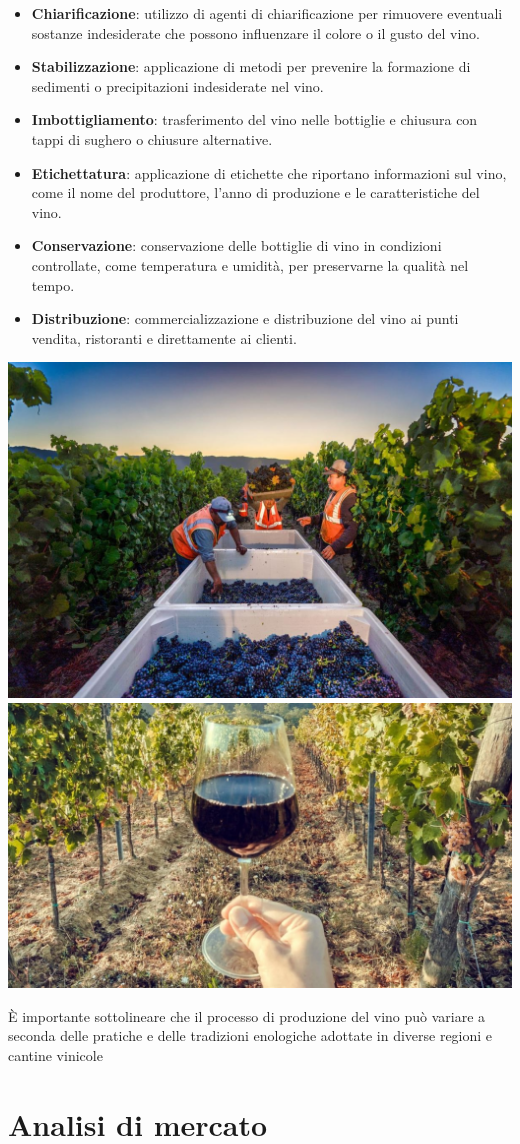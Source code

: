 \documentclass[12pt, a4paper]{article}
\begin{document}
\begin{itemize}
    \item \textbf{Chiarificazione}: utilizzo di agenti di chiarificazione per rimuovere eventuali sostanze indesiderate che possono influenzare il colore o il gusto del vino.
    \item \textbf{Stabilizzazione}: applicazione di metodi per prevenire la formazione di sedimenti o precipitazioni indesiderate nel vino.
    \item \textbf{Imbottigliamento}: trasferimento del vino nelle bottiglie e chiusura con tappi di sughero o chiusure alternative.
    \item \textbf{Etichettatura}: applicazione di etichette che riportano informazioni sul vino, come il nome del produttore, l'anno di produzione e le caratteristiche del vino.
    \item \textbf{Conservazione}: conservazione delle bottiglie di vino in condizioni controllate, come temperatura e umidità, per preservarne la qualità nel tempo.
    \item \textbf{Distribuzione}: commercializzazione e distribuzione del vino ai punti vendita, ristoranti e direttamente ai clienti.
\end{itemize}
\begin{center}
    \includegraphics[width=.48\textwidth]{images/prod_vino_1.png}
    \includegraphics[width=.48\textwidth]{images/prod_vino_2.png}
\end{center}
È importante sottolineare che il processo di produzione del vino può variare a seconda delle pratiche e delle tradizioni enologiche adottate in diverse regioni e cantine vinicole

\section{Analisi di mercato}
\end{document}
